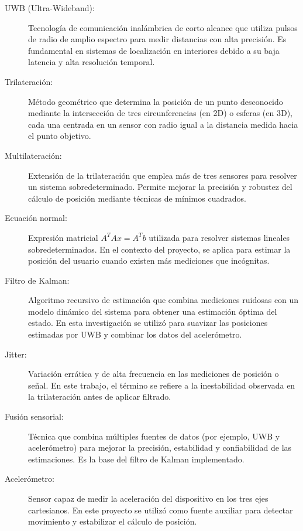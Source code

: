 \begin{description}

\item[UWB (Ultra-Wideband):] Tecnología de comunicación inalámbrica de corto alcance que utiliza pulsos de radio de amplio espectro para medir distancias con alta precisión. Es fundamental en sistemas de localización en interiores debido a su baja latencia y alta resolución temporal.

\item[Trilateración:] Método geométrico que determina la posición de un punto desconocido mediante la intersección de tres circunferencias (en 2D) o esferas (en 3D), cada una centrada en un sensor con radio igual a la distancia medida hacia el punto objetivo.

\item[Multilateración:] Extensión de la trilateración que emplea más de tres sensores para resolver un sistema sobredeterminado. Permite mejorar la precisión y robustez del cálculo de posición mediante técnicas de mínimos cuadrados.

\item[Ecuación normal:] Expresión matricial $A^T A x = A^T b$ utilizada para resolver sistemas lineales sobredeterminados. En el contexto del proyecto, se aplica para estimar la posición del usuario cuando existen más mediciones que incógnitas.

\item[Filtro de Kalman:] Algoritmo recursivo de estimación que combina mediciones ruidosas con un modelo dinámico del sistema para obtener una estimación óptima del estado. En esta investigación se utilizó para suavizar las posiciones estimadas por UWB y combinar los datos del acelerómetro.

\item[Jitter:] Variación errática y de alta frecuencia en las mediciones de posición o señal. En este trabajo, el término se refiere a la inestabilidad observada en la trilateración antes de aplicar filtrado.

\item[Fusión sensorial:] Técnica que combina múltiples fuentes de datos (por ejemplo, UWB y acelerómetro) para mejorar la precisión, estabilidad y confiabilidad de las estimaciones. Es la base del filtro de Kalman implementado.

\item[Acelerómetro:] Sensor capaz de medir la aceleración del dispositivo en los tres ejes cartesianos. En este proyecto se utilizó como fuente auxiliar para detectar movimiento y estabilizar el cálculo de posición.


\end{description}

